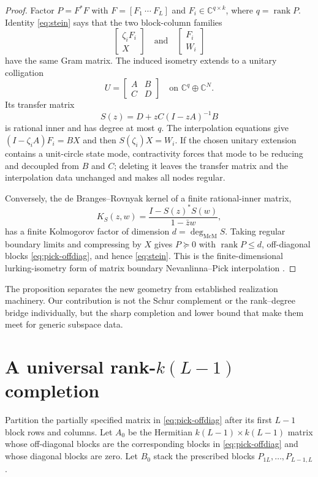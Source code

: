 \documentclass[11pt]{article}
\theoremstyle{definition}
\theoremstyle{remark}
\newcommand{\C}{\mathbb C}
\newcommand{\rank}{\operatorname{rank}}
\newcommand{\mcdeg}{\deg_{\mathrm{McM}}}
\begin{document}
\begin{proof}
Factor $P=F^*F$ with $F=[F_1\ \cdots\ F_L]$ and
$F_i\in\C^{q\times k}$, where $q=\rank P$.  Identity \eqref{eq:stein}
says that the two block-column families
\[
  \begin{bmatrix}\zeta_iF_i\\X\end{bmatrix}
  \quad\text{and}\quad
  \begin{bmatrix}F_i\\W_i\end{bmatrix}
\]
have the same Gram matrix.  The induced isometry extends to a unitary
colligation
\[
 U=\begin{bmatrix}A&B\\C&D\end{bmatrix}
 \quad\text{on }\C^q\oplus\C^N.
\]
Its transfer matrix
\[
                    S(z)=D+zC(I-zA)^{-1}B
\]
is rational inner and has degree at most $q$.  The interpolation equations
give $(I-\zeta_iA)F_i=BX$ and then $S(\zeta_i)X=W_i$.  If the chosen unitary
extension contains a unit-circle state mode, contractivity forces that mode
to be reducing and decoupled from $B$ and $C$; deleting it leaves the
transfer matrix and the interpolation data unchanged and makes all nodes
regular.

Conversely, the de Branges--Rovnyak kernel of a finite rational-inner matrix,
\[
 K_S(z,w)=\frac{I-S(z)^*S(w)}{1-\bar z w},
\]
has a finite Kolmogorov factor of dimension $d=\mcdeg S$.  Taking regular
boundary limits and compressing by $X$ gives $P\succeq0$ with
$\rank P\le d$, off-diagonal blocks \eqref{eq:pick-offdiag}, and hence
\eqref{eq:stein}.  This is the finite-dimensional lurking-isometry form of
matrix boundary Nevanlinna--Pick interpolation
\cite{BolotnikovDym2006,BallKim1994,GombaniMichaletzky2007}.
\end{proof}

The proposition separates the new geometry from established realization
machinery.  Our contribution is not the Schur complement or the
rank--degree bridge individually, but the sharp completion and lower bound
that make them meet for generic subspace data.

\section{A universal rank-\texorpdfstring{$k(L-1)$}{k(L-1)} completion}\label{sec:upper}

Partition the partially specified matrix in \eqref{eq:pick-offdiag} after its
first $L-1$ block rows and columns.  Let $A_0$ be the Hermitian
$k(L-1)\times k(L-1)$ matrix whose off-diagonal blocks are the corresponding
blocks in \eqref{eq:pick-offdiag} and whose diagonal blocks are zero.  Let
$B_0$ stack the prescribed blocks $P_{1L},\ldots,P_{L-1,L}$.
\end{document}
